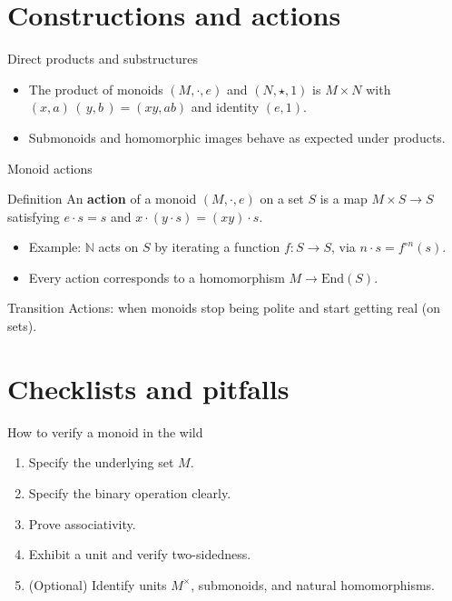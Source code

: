 \documentclass[aspectratio=169,11pt]{beamer}
\newcommand{\NN}{\mathbb{N}}
\newcommand{\End}{\mathrm{End}}
\begin{document}
\section{Constructions and actions}
\begin{frame}{Direct products and substructures}
\begin{itemize}
  \item The product of monoids $(M,\cdot,e)$ and $(N,\star,1)$ is $M\times N$ with $(x,a)\,(\,y,b\,)=(xy,ab)$ and identity $(e,1)$.
  \item Submonoids and homomorphic images behave as expected under products.
\end{itemize}
\end{frame}

\begin{frame}{Monoid actions}
\begin{block}{Definition}
An \textbf{action} of a monoid $(M,\cdot,e)$ on a set $S$ is a map $M\times S\to S$ satisfying $e\cdot s=s$ and $x\cdot (y\cdot s)=(xy)\cdot s$.
\end{block}
\begin{itemize}
  \item Example: $\NN$ acts on $S$ by iterating a function $f:S\to S$, via $n\cdot s=f^{\circ n}(s)$.
  \item Every action corresponds to a homomorphism $M\to \End(S)$.
\end{itemize}
\begin{block}{Transition}
Actions: when monoids stop being polite and start getting real (on sets).
\end{block}
\end{frame}

\section{Checklists and pitfalls}
\begin{frame}{How to verify a monoid in the wild}
\begin{enumerate}
  \item Specify the underlying set $M$.
  \item Specify the binary operation clearly.
  \item Prove associativity.
  \item Exhibit a unit and verify two-sidedness.
  \item (Optional) Identify units $M^\times$, submonoids, and natural homomorphisms.
\end{enumerate}
\end{frame}
\end{document}
